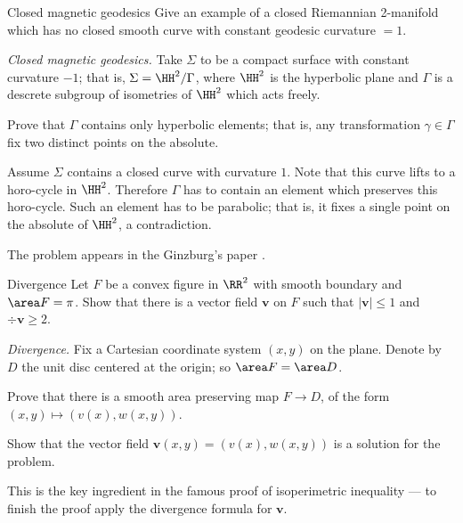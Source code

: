 \begin{pr}{}{Closed magnetic geodesics}\label{twisted-geodesic} %
Give an example of a closed Riemannian 
2-manifold which has no closed smooth curve with constant geodesic curvature $=1$.
\end{pr}

\textit{Closed magnetic geodesics.}
Take $\Sigma$ to be a compact surface with constant curvature $-1$;
that is, 
 $\Sigma=\HH^2/\Gamma$,
where $\HH^2$
is the hyperbolic plane 
and $\Gamma$ is a descrete subgroup of isometries of $\HH^2$ which acts freely.

Prove that $\Gamma$ contains only hyperbolic elements; that is, any transformation $\gamma\in\Gamma$ fix two distinct points on the absolute.

Assume $\Sigma$ contains a closed curve with curvature $1$.
Note that this curve lifts to a horo-cycle in $\HH^2$.
Therefore $\Gamma$ has to contain an element which preserves this horo-cycle.
Such an element has to be parabolic;
that is, it fixes a single point on the absolute of $\HH^2$,
 a contradiction.

The problem appears in the Ginzburg's paper \cite{ginzburg}.












\begin{pr}{}{Divergence}\label{Divergence} %
Let $F$ be a convex figure in $\RR^2$ with smooth boundary
and $\area F=\pi$.
Show that there is a vector field $\bm{v}$ on $F$
such that $|\bm{v}|\le 1$ and $\div \bm{v}\ge 2$. 
\end{pr}

\textit{Divergence.}
Fix a Cartesian coordinate system $(x,y)$ on the plane.
Denote by $D$ the unit disc centered at the origin;
so $\area F=\area D$.
 
Prove that there is a smooth area preserving map $F\to D$, 
of the form
$(x,y)\mapsto (v(x),w(x,y))$.

Show that the vector field $\bm{v}(x,y)=(v(x),w(x,y))$
is a solution for the problem.

This is the key ingredient in the famous proof of isoperimetric inequality --- to finish the proof apply the divergence formula for $\bm{v}$.

